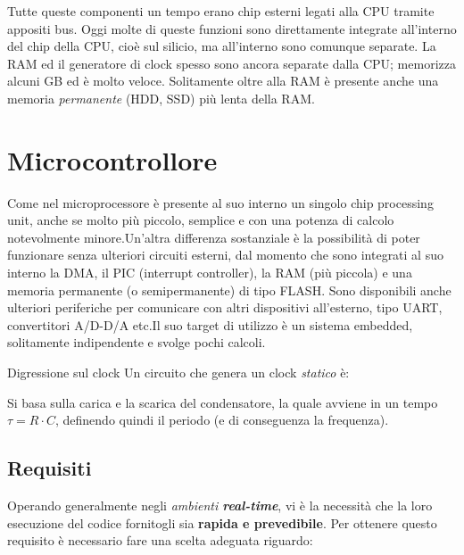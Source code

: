\documentclass[
]{book}
\begin{document}
Tutte queste componenti un tempo erano chip esterni legati alla CPU
tramite appositi bus. Oggi molte di queste funzioni sono direttamente
integrate all'interno del chip della CPU, cioè sul silicio, ma
all'interno sono comunque separate. La RAM ed il generatore di clock
spesso sono ancora separate dalla CPU; memorizza alcuni GB ed è molto
veloce. Solitamente oltre alla RAM è presente anche una memoria
\emph{permanente} (HDD, SSD) più lenta della RAM.

\section{Microcontrollore}\label{microcontrollore}

Come nel microprocessore è presente al suo interno un singolo chip
processing unit, anche se molto più piccolo, semplice e con una potenza
di calcolo notevolmente minore.\newline Un'altra differenza sostanziale
è la possibilità di poter funzionare senza ulteriori circuiti esterni,
dal momento che sono integrati al suo interno la DMA, il PIC (interrupt
controller), la RAM (più piccola) e una memoria permanente (o
semipermanente) di tipo FLASH. Sono disponibili anche ulteriori
periferiche per comunicare con altri dispositivi all'esterno, tipo UART,
convertitori A/D-D/A etc.\newline Il suo target di utilizzo è un sistema
embedded, solitamente indipendente e svolge pochi calcoli.

\begin{redbox}{Digressione sul clock}
Un circuito che genera un clock \emph{statico} è:
\begin{center}
\begin{minipage}{0.6\linewidth}
\centering
\resizebox{0.6\textwidth}{!}{%
}
\end{minipage}
\end{center}
Si basa sulla carica e la scarica del condensatore, la quale avviene in un tempo $\tau=R\cdot C$, definendo quindi il periodo (e di conseguenza la frequenza).
\end{redbox}

\subsection{Requisiti}\label{requisiti}

Operando generalmente negli \emph{ambienti \textbf{real-time}}, vi è la
necessità che la loro esecuzione del codice fornitogli sia
\textbf{rapida e prevedibile}. Per ottenere questo requisito è
necessario fare una scelta adeguata riguardo:
\end{document}
